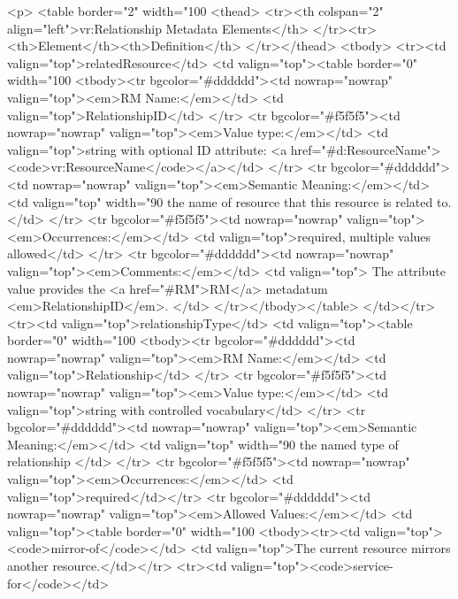 \documentclass[11pt,a4paper]{ivoa}
\begin{document}
<p>
<table border="2" width="100%
<thead>
  <tr><th colspan="2" align="left">vr:Relationship Metadata Elements</th>
  </tr><tr><th>Element</th><th>Definition</th>
</tr></thead>
<tbody>
  <tr><td valign="top">relatedResource</td>
      <td valign="top"><table border="0" width="100%
          <tbody><tr bgcolor="#dddddd"><td nowrap="nowrap" valign="top"><em>RM Name:</em></td>
              <td valign="top">RelationshipID</td>
          </tr>
          <tr bgcolor="#f5f5f5"><td nowrap="nowrap" valign="top"><em>Value type:</em></td>
              <td valign="top">string with optional ID attribute: <a href="#d:ResourceName"><code>vr:ResourceName</code></a></td>
          </tr>
          <tr bgcolor="#dddddd"><td nowrap="nowrap" valign="top"><em>Semantic Meaning:</em></td>
              <td valign="top" width="90%
                 the name of resource that this resource is related to.
              </td>
          </tr>
          <tr bgcolor="#f5f5f5"><td nowrap="nowrap" valign="top"><em>Occurrences:</em></td>
              <td valign="top">required, multiple values allowed</td>
          </tr>
          <tr bgcolor="#dddddd"><td nowrap="nowrap" valign="top"><em>Comments:</em></td>
              <td valign="top">
                The attribute value provides the <a href="#RM">RM</a>
                metadatum <em>RelationshipID</em>.
              </td>
          </tr></tbody></table>
      </td></tr>
  <tr><td valign="top">relationshipType</td>
      <td valign="top"><table border="0" width="100%
          <tbody><tr bgcolor="#dddddd"><td nowrap="nowrap" valign="top"><em>RM Name:</em></td>
              <td valign="top">Relationship</td>
          </tr>
          <tr bgcolor="#f5f5f5"><td nowrap="nowrap" valign="top"><em>Value type:</em></td>
              <td valign="top">string with controlled vocabulary</td>
          </tr>
          <tr bgcolor="#dddddd"><td nowrap="nowrap" valign="top"><em>Semantic Meaning:</em></td>
              <td valign="top" width="90%
                 the named type of relationship
              </td>
          </tr>
          <tr bgcolor="#f5f5f5"><td nowrap="nowrap" valign="top"><em>Occurrences:</em></td>
              <td valign="top">required</td></tr>
          <tr bgcolor="#dddddd"><td nowrap="nowrap" valign="top"><em>Allowed Values:</em></td>
              <td valign="top"><table border="0" width="100%
                 <tbody><tr><td valign="top"><code>mirror-of</code></td>
                     <td valign="top">The current resource mirrors
                         another resource.</td></tr>
                 <tr><td valign="top"><code>service-for</code></td>
\end{document}
